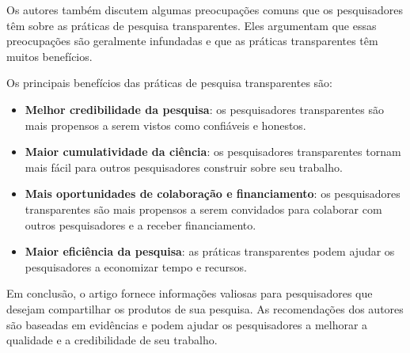 \documentclass[
  a4paper,
]{book}
\begin{document}
\begin{tcolorbox}
Os autores também discutem algumas preocupações comuns que os
pesquisadores têm sobre as práticas de pesquisa transparentes. Eles
argumentam que essas preocupações são geralmente infundadas e que as
práticas transparentes têm muitos benefícios.\vspace{0.5em}

Os principais benefícios das práticas de pesquisa transparentes
são:\vspace{0.5em}

\begin{itemize}
\item
  \textbf{Melhor credibilidade da pesquisa}: os pesquisadores
  transparentes são mais propensos a serem vistos como confiáveis e
  honestos.
\item
  \textbf{Maior cumulatividade da ciência}: os pesquisadores
  transparentes tornam mais fácil para outros pesquisadores construir
  sobre seu trabalho.
\item
  \textbf{Mais oportunidades de colaboração e financiamento}: os
  pesquisadores transparentes são mais propensos a serem convidados para
  colaborar com outros pesquisadores e a receber financiamento.
\item
  \textbf{Maior eficiência da pesquisa}: as práticas transparentes podem
  ajudar os pesquisadores a economizar tempo e recursos.\vspace{0.5em}
\end{itemize}

Em conclusão, o artigo fornece informações valiosas para pesquisadores
que desejam compartilhar os produtos de sua pesquisa. As recomendações
dos autores são baseadas em evidências e podem ajudar os pesquisadores a
melhorar a qualidade e a credibilidade de seu trabalho.

\end{tcolorbox}
\end{document}
